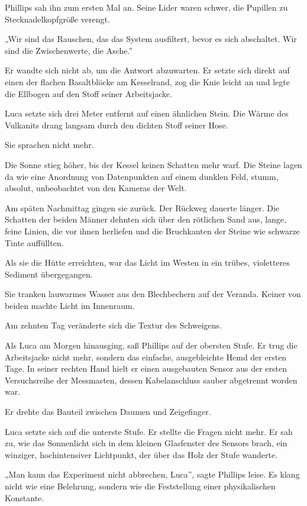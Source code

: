 \documentclass[
  ngerman,
]{article}
\begin{document}
Phillips sah ihn zum ersten Mal an. Seine Lider waren schwer, die
Pupillen zu Stecknadelkopfgröße verengt.

„Wir sind das Rauschen, das das System ausfiltert, bevor es sich
abschaltet. Wir sind die Zwischenwerte, die Asche.''

Er wandte sich nicht ab, um die Antwort abzuwarten. Er setzte sich
direkt auf einen der flachen Basaltblöcke am Kesselrand, zog die Knie
leicht an und legte die Ellbogen auf den Stoff seiner Arbeitsjacke.

Luca setzte sich drei Meter entfernt auf einen ähnlichen Stein. Die
Wärme des Vulkanits drang langsam durch den dichten Stoff seiner Hose.

Sie sprachen nicht mehr.

Die Sonne stieg höher, bis der Kessel keinen Schatten mehr warf. Die
Steine lagen da wie eine Anordnung von Datenpunkten auf einem dunklen
Feld, stumm, absolut, unbeobachtet von den Kameras der Welt.

Am späten Nachmittag gingen sie zurück. Der Rückweg dauerte länger. Die
Schatten der beiden Männer dehnten sich über den rötlichen Sand aus,
lange, feine Linien, die vor ihnen herliefen und die Bruchkanten der
Steine wie schwarze Tinte auffüllten.

Als sie die Hütte erreichten, war das Licht im Westen in ein trübes,
violetteres Sediment übergegangen.

Sie tranken lauwarmes Wasser aus den Blechbechern auf der Veranda.
Keiner von beiden machte Licht im Innenraum.

Am zehnten Tag veränderte sich die Textur des Schweigens.

Als Luca am Morgen hinausging, saß Phillips auf der obersten Stufe. Er
trug die Arbeitsjacke nicht mehr, sondern das einfache, ausgebleichte
Hemd der ersten Tage. In seiner rechten Hand hielt er einen ausgebauten
Sensor aus der ersten Versuchsreihe der Messmasten, dessen
Kabelanschluss sauber abgetrennt worden war.

Er drehte das Bauteil zwischen Daumen und Zeigefinger.

Luca setzte sich auf die unterste Stufe. Er stellte die Fragen nicht
mehr. Er sah zu, wie das Sonnenlicht sich in dem kleinen Glasfenster des
Sensors brach, ein winziger, hochintensiver Lichtpunkt, der über das
Holz der Stufe wanderte.

„Man kann das Experiment nicht abbrechen, Luca'', sagte Phillips leise.
Es klang nicht wie eine Belehrung, sondern wie die Feststellung einer
physikalischen Konstante.
\end{document}
